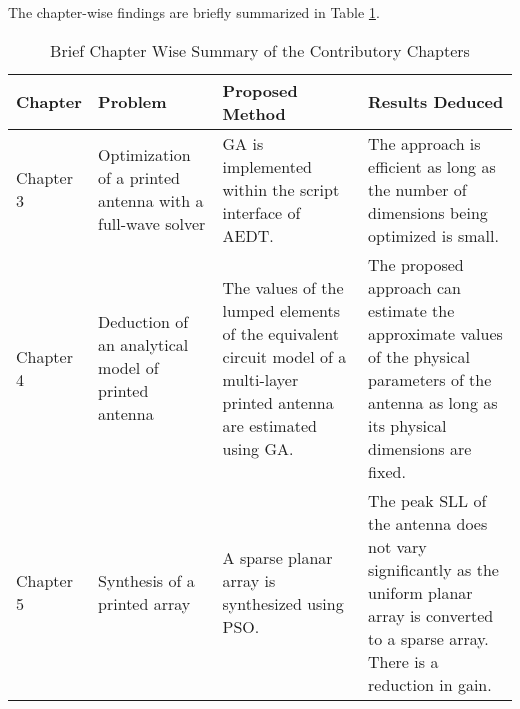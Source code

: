 The chapter-wise findings are briefly summarized in Table \ref{tab-chap-summary}.
\begin{table}
\centering
\caption{Brief Chapter Wise Summary of the Contributory Chapters}\label{tab-chap-summary}
\begin{tabular}{|p{}|p{}|p{}|p{}|}
  \toprule
  Chapter & Problem & Proposed Method & Results Deduced \\ \midrule
  Chapter 3 & Optimization of a printed antenna with a full-wave solver & GA is implemented within the script interface of AEDT. & The approach is efficient as long as the number of dimensions being optimized is small. \\ \hline
  Chapter 4 & Deduction of an analytical model of printed antenna & The values of the lumped elements of the equivalent circuit model of a multi-layer printed antenna are estimated using GA. & The proposed approach can estimate the approximate values of the physical parameters of the antenna as long as its physical dimensions are fixed. \\ \hline
  Chapter 5 & Synthesis of a printed array & A sparse planar array is synthesized using PSO. & The peak SLL of the antenna does not vary significantly as the uniform planar array is converted to a sparse array. There is a reduction in gain. \\ \bottomrule
  \hline
\end{tabular}
\end{table}

